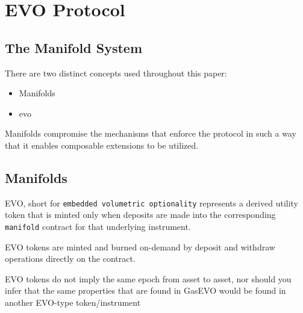 


\chapter{EVO Protocol }\label{sec:evoprotocol}


\section{The Manifold System}

There are two distinct concepts used throughout this paper:
\begin{itemize}
    \item Manifolds
    \item evo
\end{itemize}

\label{Manifolds}Manifolds compromise the mechanisms that enforce the
protocol in such a way that it enables composable extensions to be
utilized. 

\section{Manifolds}\label{sec:manifolds}
EVO, short for \texttt{embedded volumetric optionality} represents a
derived utility token that is minted only when deposits are made into
the corresponding \texttt{manifold} contract for that underlying
instrument. 

EVO tokens are minted and burned on-demand by deposit and withdraw
operations directly on the contract.\linebreak

\begin{tcolorbox}
EVO tokens do not imply the same epoch from asset to asset, nor should you infer that the same properties that are found in GasEVO would be found in another EVO-type token/instrument
\end{tcolorbox}


